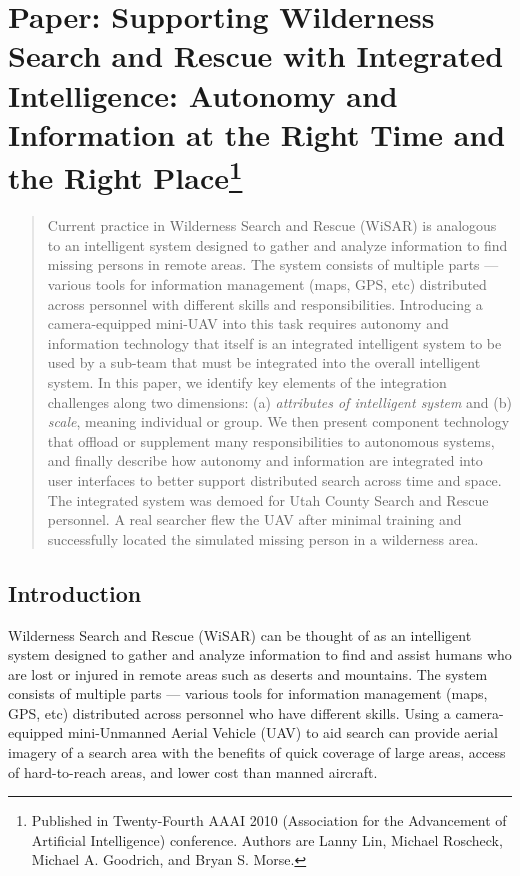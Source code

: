 \chapter[Paper: Supporting Wilderness Search and Rescue with Integrated Intelligence: Autonomy and Information at the Right Time and the Right Place]{Paper: Supporting Wilderness Search and Rescue with Integrated Intelligence: Autonomy and Information at the Right Time and the Right Place\footnote {Published in Twenty-Fourth AAAI 2010 (Association for the Advancement of Artificial Intelligence) conference. Authors are Lanny Lin, Michael Roscheck, Michael A. Goodrich, and Bryan S. Morse.}}
\label{chap:AAAI2010}

\begin{abstract}
Current practice in Wilderness Search and Rescue (WiSAR) is analogous to an intelligent system designed to gather and analyze information to find missing persons in remote areas. The system consists of multiple parts --- various tools for information management (maps, GPS, etc) distributed across personnel with different skills and responsibilities. Introducing a camera-equipped mini-UAV into this task requires autonomy and information technology that itself is an integrated intelligent system to be used by a sub-team that must be integrated into the overall intelligent system. In this paper, we identify key elements of the integration challenges along two dimensions: (a) \textit{attributes of intelligent system} and (b) \textit{scale}, meaning individual or group. We then present component technology that offload or supplement many responsibilities to autonomous systems, and finally describe how autonomy and information are integrated into user interfaces to better support distributed search across time and space. The integrated system was demoed for Utah County Search and Rescue personnel. A real searcher flew the UAV after minimal training and successfully located the simulated missing person in a wilderness area.
\end{abstract}


\section{Introduction}
Wilderness Search and Rescue (WiSAR) can be thought of as an intelligent system designed to gather and analyze information to find and assist humans who are lost or injured in remote areas such as deserts and mountains. The system consists of multiple parts --- various tools for information management (maps, GPS, etc) distributed across personnel who have different skills. Using a camera-equipped mini-Unmanned Aerial Vehicle (UAV) to aid search can provide aerial imagery of a search area with the benefits of quick coverage of large areas, access of hard-to-reach areas, and lower cost than manned aircraft. 

